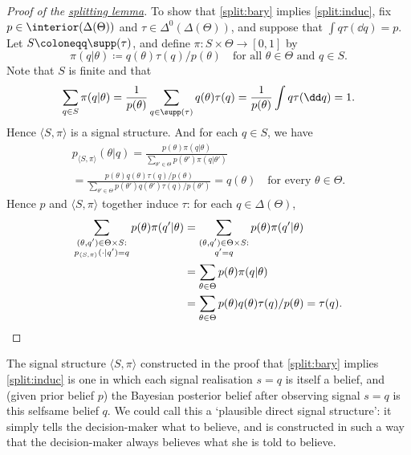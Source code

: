 \begin{proof}[Proof of the {\hyperref[lemma:split]{splitting lemma}}]
	To show that \ref{split:bary} implies \ref{split:induc}, fix $p \in \interior(\Delta(\Theta))$ and $\tau \in \Delta^0(\Delta(\Theta))$, and suppose that $\int q \tau( \dd q ) = p$. Let $S \coloneqq \supp(\tau)$, and define $\pi : S \times \Theta \to [0,1]$ by
	\begin{equation*}
		\pi(q|\theta)
		\coloneqq q(\theta) \tau(q) / p(\theta)
		\quad \text{for all $\theta \in \Theta$ and $q \in S$.}
	\end{equation*}
	Note that $S$ is finite and that
	\begin{equation*}
		\sum_{q \in S} \pi(q|\theta)
		= \frac{1}{p(\theta)} \sum_{q \in \supp(\tau)} q(\theta) \tau(q)
		= \frac{1}{p(\theta)} \int q \tau( \dd q )
		= 1 .
	\end{equation*}
	Hence $\langle S, \pi \rangle $ is a signal structure. And for each $q \in S$, we have
	\begin{multline*}
		p_{\langle S, \pi \rangle }(\theta|q)
		= \frac{p(\theta) \pi(q|\theta)}{\sum_{\theta' \in \Theta} p(\theta') \pi(q|\theta')} 
		\\
		= \frac{p(\theta) q(\theta) \tau(q) / p(\theta)}{\sum_{\theta' \in \Theta} p(\theta') q(\theta') \tau(q) / p(\theta')} 
		= q(\theta) 
		\quad \text{for every $\theta \in \Theta$.}
	\end{multline*}
	Hence $p$ and $\langle S, \pi \rangle $ together induce $\tau$: for each $q \in \Delta(\Theta)$,
	\begin{align*}
		\sum_{\substack{(\theta,q') \in \Theta \times S :\\ p_{\langle S, \pi \rangle }(\cdot|q') = q}} p(\theta) \pi(q'|\theta)
		&= \sum_{\substack{(\theta,q') \in \Theta \times S :\\ q' = q}} p(\theta) \pi(q'|\theta)
		\\
		&= \sum_{\theta \in \Theta} p(\theta) \pi(q|\theta)
		\\
		&= \sum_{\theta \in \Theta} p(\theta) q(\theta) \tau(q) / p(\theta)
		= \tau(q) . \qedhere
	\end{align*}
\end{proof}

The signal structure $\langle S, \pi \rangle $ constructed in the proof that \ref{split:bary} implies \ref{split:induc} is one in which each signal realisation $s=q$ is itself a belief, and (given prior belief $p$) the Bayesian posterior belief after observing signal $s=q$ is this selfsame belief $q$. We could call this a `plausible direct signal structure': it simply tells the decision-maker what to believe, and is constructed in such a way that the decision-maker always believes what she is told to believe.

